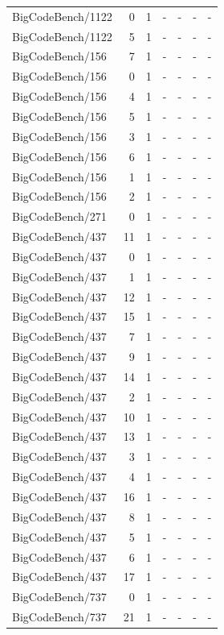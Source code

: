 \begin{longtable}{lrrllll}
BigCodeBench/1122 & 0 & 1 & - & - & - & - \\
BigCodeBench/1122 & 5 & 1 & - & - & - & - \\
BigCodeBench/156 & 7 & 1 & - & - & - & - \\
BigCodeBench/156 & 0 & 1 & - & - & - & - \\
BigCodeBench/156 & 4 & 1 & - & - & - & - \\
BigCodeBench/156 & 5 & 1 & - & - & - & - \\
BigCodeBench/156 & 3 & 1 & - & - & - & - \\
BigCodeBench/156 & 6 & 1 & - & - & - & - \\
BigCodeBench/156 & 1 & 1 & - & - & - & - \\
BigCodeBench/156 & 2 & 1 & - & - & - & - \\
BigCodeBench/271 & 0 & 1 & - & - & - & - \\
BigCodeBench/437 & 11 & 1 & - & - & - & - \\
BigCodeBench/437 & 0 & 1 & - & - & - & - \\
BigCodeBench/437 & 1 & 1 & - & - & - & - \\
BigCodeBench/437 & 12 & 1 & - & - & - & - \\
BigCodeBench/437 & 15 & 1 & - & - & - & - \\
BigCodeBench/437 & 7 & 1 & - & - & - & - \\
BigCodeBench/437 & 9 & 1 & - & - & - & - \\
BigCodeBench/437 & 14 & 1 & - & - & - & - \\
BigCodeBench/437 & 2 & 1 & - & - & - & - \\
BigCodeBench/437 & 10 & 1 & - & - & - & - \\
BigCodeBench/437 & 13 & 1 & - & - & - & - \\
BigCodeBench/437 & 3 & 1 & - & - & - & - \\
BigCodeBench/437 & 4 & 1 & - & - & - & - \\
BigCodeBench/437 & 16 & 1 & - & - & - & - \\
BigCodeBench/437 & 8 & 1 & - & - & - & - \\
BigCodeBench/437 & 5 & 1 & - & - & - & - \\
BigCodeBench/437 & 6 & 1 & - & - & - & - \\
BigCodeBench/437 & 17 & 1 & - & - & - & - \\
BigCodeBench/737 & 0 & 1 & - & - & - & - \\
BigCodeBench/737 & 21 & 1 & - & - & - & - \\

\end{longtable}

